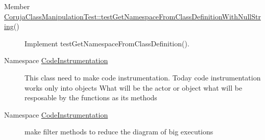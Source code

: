 \label{todo__todo000008}
\hypertarget{todo__todo000008}{}
 \begin{description}
\item[Member \hyperlink{class_coruja_class_manipulation_test_ce9cf206ad48a158cd897305919b68cf}{CorujaClassManipulationTest::testGetNamespaceFromClassDefinitionWithNullString}() ]Implement testGetNamespaceFromClassDefinition(). \end{description}


\label{todo__todo000001}
\hypertarget{todo__todo000001}{}
 \begin{description}
\item[Namespace \hyperlink{namespace_code_instrumentation}{CodeInstrumentation} ]This class need to make code instrumentation. Today code instrumentation works only into objects  What will be the actor or object what will be resposable by the functions as its methods

\end{description}


\label{todo__todo000002}
\hypertarget{todo__todo000002}{}
 \begin{description}
\item[Namespace \hyperlink{namespace_code_instrumentation}{CodeInstrumentation} ]make filter methods to reduce the diagram of big executions

\end{description}
